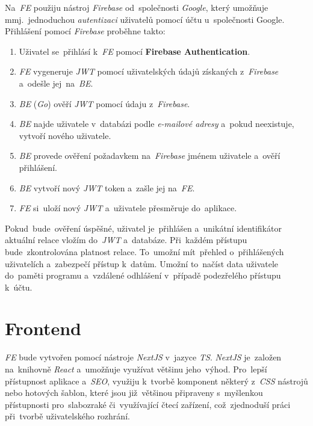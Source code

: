\documentclass[11pt,a4paper]{report}
\let\oldacrshort\acrshort
\renewcommand{\acrshort}[1]{\emph{\normalsize\color[rgb]{0,0,0}\noindent\oldacrshort{#1}}}
\begin{document}
            Na~\acrshort{FE} použiju nástroj \emph{Firebase} od~společnosti \emph{Google}, který umožňuje mmj.~jednoduchou \emph{autentizaci} uživatelů pomocí účtu u~společnosti Google. Přihlášení pomocí \emph{Firebase} proběhne takto:
            \begin{enumerate}
                \item Uživatel se~přihlásí k~\acrshort{FE} pomocí \textbf{Firebase Authentication}.
                \item \acrshort{FE} vygeneruje \acrshort{JWT} pomocí uživatelských údajů získaných z~\emph{Firebase} a~odešle jej~na~\acrshort{BE}.
                \item \acrshort{BE} (\emph{Go}) ověří \acrshort{JWT} pomocí údaju z~\emph{Firebase}.
                \item \acrshort{BE} najde uživatele v~databázi podle \emph{e-mailové adresy} a~pokud neexistuje, vytvoří nového uživatele.
                \item \acrshort{BE} provede ověření požadavkem na~\emph{Firebase} jménem uživatele a~ověří přihlášení.
                \item \acrshort{BE} vytvoří nový \acrshort{JWT} token a~zašle jej na~\acrshort{FE}.
                \item \acrshort{FE} si~uloží nový \acrshort{JWT} a~uživatele přesměruje do~aplikace.
            \end{enumerate}
            
            Pokud~bude~ověření úspěšné, uživatel je~přihlášen a~unikátní identifikátor aktuální relace vložím do~\acrshort{JWT} a~databáze. Při~každém přístupu bude~zkontrolována platnost relace. To~umožní mít~přehled o~přihlášených uživatelích a~zabezpečí přístup k~datům. Umožní to~načíst data uživatele do~paměti programu a~vzdálené odhlášení v~případě podezřelého přístupu k~účtu.

        \section{Frontend}
            \acrshort{FE} bude vytvořen pomocí nástroje \emph{NextJS} v~jazyce \acrshort{TS}. \emph{NextJS} je~založen na~knihovně \emph{React} a~umožňuje využívat většinu jeho~výhod. Pro~lepší přístupnost aplikace a~\acrshort{SEO}, využiju k~tvorbě komponent některý z~\acrshort{CSS} nástrojů nebo hotových šablon, které jsou již~většinou připraveny s~myšlenkou přístupnosti pro~slabozraké či~využívající čtecí zařízení, což~zjednoduší práci při~tvorbě uživatelského rozhrání.
\end{document}
